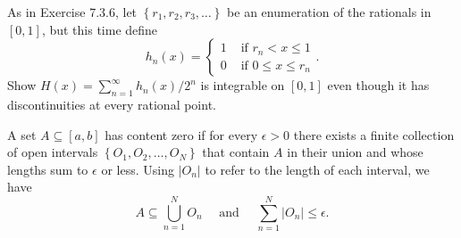 \begin{exercise} As in Exercise 7.3.6, let $\left\{r_{1}, r_{2}, r_{3}, \ldots\right\}$ be an enumeration of the rationals in $[0,1]$, but this time define
$$
h_{n}(x)=\left\{\begin{array}{ll}
1 & \text { if } r_{n}<x \leq 1 \\
0 & \text { if } 0 \leq x \leq r_{n}
\end{array} .\right.
$$
Show $H(x)=\sum_{n=1}^{\infty} h_{n}(x) / 2^{n}$ is integrable on $[0,1]$ even though it has discontinuities at every rational point.
\end{exercise}
\begin{solution}
    \TODO
\end{solution}

\begin{exercise} A set $A \subseteq[a, b]$ has content zero if for every $\epsilon>0$ there exists a finite collection of open intervals $\left\{O_{1}, O_{2}, \ldots, O_{N}\right\}$ that contain $A$ in their union and whose lengths sum to $\epsilon$ or less. Using $\left|O_{n}\right|$ to refer to the length of each interval, we have
$$
A \subseteq \bigcup_{n=1}^{N} O_{n} \quad \text { and } \quad \sum_{n=1}^{N}\left|O_{n}\right| \leq \epsilon .
$$
\end{exercise}
\begin{solution}
    \TODO
\end{solution}
